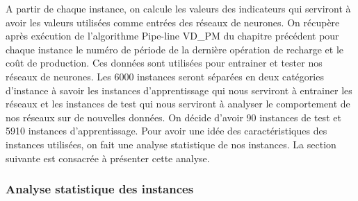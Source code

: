 A partir de chaque instance, on calcule les valeurs des indicateurs qui serviront à avoir les valeurs utilisées comme entrées des réseaux de neurones. On récupère après exécution de l'algorithme Pipe-line VD\_PM du chapitre précédent pour chaque instance le numéro de période de la dernière opération de recharge et le coût de production. Ces données sont utilisées pour entrainer et tester nos réseaux de neurones. Les 6000 instances seront séparées en deux catégories d'instance à savoir les instances d'apprentissage qui nous serviront à entrainer les réseaux et les instances de test qui nous serviront à analyser le comportement de nos réseaux sur de nouvelles données. On décide d'avoir 90 instances de test et 5910 instances d'apprentissage. Pour avoir une idée des caractéristiques des instances utilisées, on fait une analyse statistique de nos instances. La section suivante est consacrée à présenter cette analyse.




\subsubsection{Analyse statistique des instances}



